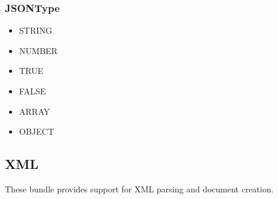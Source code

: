 \documentclass[11pt]{article}
\begin{document}
\subsubsection{JSONType}
\begin{itemize}
\item STRING
\item NUMBER
\item TRUE
\item FALSE
\item ARRAY
\item OBJECT
\end{itemize}

\subsection{XML}
These bundle provides support for XML parsing and document creation.
\end{document}
